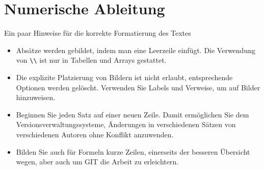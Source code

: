 %
%
%
\chapter{Numerische Ableitung\label{chapter:ableitung}}
\begin{refsection}

Ein paar Hinweise für die korrekte Formatierung des Textes
\begin{itemize}
\item
Absätze werden gebildet, indem man eine Leerzeile einfügt.
Die Verwendung von \verb+\\+ ist nur in Tabellen und Arrays gestattet.
\item
Die explizite Platzierung von Bildern ist nicht erlaubt, entsprechende
Optionen werden gelöscht. 
Verwenden Sie Labels und Verweise, um auf Bilder hinzuweisen.
\item
Beginnen Sie jeden Satz auf einer neuen Zeile. 
Damit ermöglichen Sie dem Versionsverwaltungssysteme, Änderungen
in verschiedenen Sätzen von verschiedenen Autoren ohne Konflikt 
anzuwenden.
\item 
Bilden Sie auch für Formeln kurze Zeilen, einerseits der besseren
Übersicht wegen, aber auch um GIT die Arbeit zu erleichtern.
\end{itemize}






\printbibliography[heading=subbibliography]
\end{refsection}
